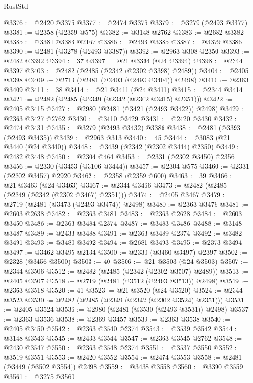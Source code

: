 \begin{lexlean}{RustStd}
\begin{coremodule}
@3376 := @2420 @3375
@3377 := @2474 @3376
@3379 := @3279 (@2493 @3377)
@3381 := @2358 (@2359 @575)
@3382 := @3148 @2762
@3383 := @2682 @3382
@3385 := @3381 @3383 @2167
@3386 := @2493 @3385
@3387 := @3379 @3386
@3390 := @2481 (@3278 (@2493 @3387))
@3392 := @2963 @308 @2350
@3393 := @2482 @3392
@3394 := 37
@3397 := @21 @3394 (@24 @3394)
@3398 := @2344 @3397
@3403 := @2482 (@2485 (@2342 (@2302 @3398) @2489))
@3404 := @2405 @3398
@3409 := @2719 (@2481 (@3403 (@2493 @3404)) @2498)
@3410 := @2363 @3409
@3411 := 38
@3414 := @21 @3411 (@24 @3411)
@3415 := @2344 @3414
@3421 := @2482 (@2485 (@2349 (@2342 (@2302 @3415) @2351)))
@3422 := @2405 @3415
@3427 := @2980 (@2481 (@3421 (@2493 @3422)) @2498)
@3429 := @2363 @3427 @2762
@3430 := @3410 @3429
@3431 := @2420 @3430
@3432 := @2474 @3431
@3435 := @3279 (@2493 @3432) @3386
@3438 := @2481 (@3393 (@2493 @3435))
@3439 := @2963 @313
@3440 := 45
@3444 := @3083 (@21 @3440 (@24 @3440))
@3448 := @3439 (@2342 (@2302 @3444) @2350)
@3449 := @2482 @3448
@3450 := @2304 @464
@3453 := @2331 (@2302 @3450) @2356
@3456 := @2330 (@3453 (@3106 @3444))
@3457 := @2304 @575
@3460 := @2331 (@2302 @3457) @2920
@3462 := @2358 (@2359 @600)
@3463 := 39
@3466 := @21 @3463 (@24 @3463)
@3467 := @2344 @3466
@3473 := @2482 (@2485 (@2349 (@2342 (@2302 @3467) @2351)))
@3474 := @2405 @3467
@3479 := @2719 (@2481 (@3473 (@2493 @3474)) @2498)
@3480 := @2363 @3479
@3481 := @2603 @2638
@3482 := @2363 @3481
@3483 := @2363 @2628
@3484 := @2603 @3450
@3486 := @2363 @3484 @2374
@3487 := @3483 @3486
@3488 := @3148 @3487
@3489 := @2433 @3488
@3491 := @2363 @3489 @2374
@3492 := @3482 @3491
@3493 := @3480 @3492
@3494 := @2681 @3493
@3495 := @2373 @3494
@3497 := @3462 @3495 @2134
@3500 := @2330 (@3460 @3497) @2397
@3502 := @2328 (@3456 @3500)
@3503 := 40
@3506 := @21 @3503 (@24 @3503)
@3507 := @2344 @3506
@3512 := @2482 (@2485 (@2342 (@2302 @3507) @2489))
@3513 := @2405 @3507
@3518 := @2719 (@2481 (@3512 (@2493 @3513)) @2498)
@3519 := @2363 @3518
@3520 := 41
@3523 := @21 @3520 (@24 @3520)
@3524 := @2344 @3523
@3530 := @2482 (@2485 (@2349 (@2342 (@2302 @3524) @2351)))
@3531 := @2405 @3524
@3536 := @2980 (@2481 (@3530 (@2493 @3531)) @2498)
@3537 := @2363 @3536
@3538 := @2369 @3457
@3539 := @2363 @3538
@3540 := @2405 @3450
@3542 := @2363 @3540 @2374
@3543 := @3539 @3542
@3544 := @3148 @3543
@3545 := @2433 @3544
@3547 := @2363 @3545 @2762
@3548 := @2430 @3547
@3550 := @2363 @3548 @2374
@3551 := @3537 @3550
@3552 := @3519 @3551
@3553 := @2420 @3552
@3554 := @2474 @3553
@3558 := @2481 (@3449 (@3502 @3554)) @2498
@3559 := @3438 @3558
@3560 := @3390 @3559
@3561 := @3275 @3560

\end{coremodule}
\end{lexlean}
